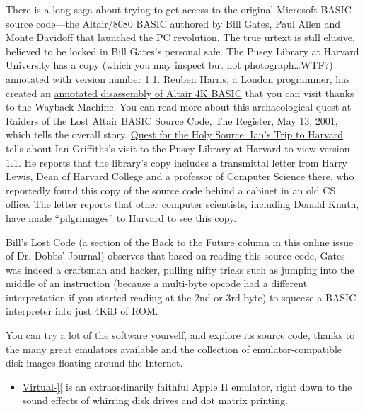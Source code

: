 \documentclass{article}
\begin{document}
There is a long saga about trying to get access to the original
Microsoft BASIC source code---the Altair/8080 BASIC authored by Bill
Gates, Paul Allen and Monte Davidoff that launched the PC revolution.
The true urtext is still elusive, believed to be locked in Bill Gates's
personal safe.
The Pusey Library at Harvard University has a copy (which you may
inspect but not photograph\ldots{}WTF?) annotated with version number
1.1.
Reuben Harris, a London programmer, has created an
\href{http://web.archive.org/web/20011211233332/www.rjh.org.uk/altair/4k/index2.html}{annotated
disassembly of Altair 4K BASIC} that you can visit thanks to the
Wayback Machine.
You can read more about this archaeological quest at
\href{http://www.theregister.co.uk/2001/05/13/raiders_of_the_lost_altair/}{Raiders
of the Lost Altair BASIC Source Code}, The Register, May 13, 2001,
which tells the overall story.
\href{http://www.interact-sw.co.uk/altair/other\%20versions/ian.htm}{Quest
for the Holy Source: Ian's Trip to Harvard} tells about Ian
Griffiths's visit to the Pusey Library at Harvard to view version
1.1.
He reports that the library's copy includes a transmittal letter from
Harry Lewis, Dean of Harvard College and a professor of Computer
Science there, who reportedly found this copy of the source code behind
a cabinet in an old CS office.
The letter reports that other computer scientists, including Donald
Knuth, have made ``pilgrimages'' to Harvard to see this copy.

\href{http://www.drdobbs.com/back-to-the-future/184404733}{Bill's
  Lost Code} (a section of the Back to the Future column in this online
issue of Dr. Dobbs' Journal) observes that based on reading this source
code, Gates was indeed a craftsman and hacker, pulling nifty tricks such
as jumping into the middle of an instruction (because a multi-byte
opcode had a different interpretation if you started reading at the 2nd
or 3rd byte) to squeeze a BASIC interpreter into just 4KiB of ROM.

You can try a lot of the software yourself, and explore
its source code, thanks to the many great emulators available and the
collection of emulator-compatible disk images floating around the Internet.

\begin{itemize}
\item \href{http://virtualii.com}{Virtual-][} is an extraordinarily
  faithful Apple II emulator, right down to the sound effects of
  whirring disk drives and dot matrix printing.

\end{itemize}
\end{document}
